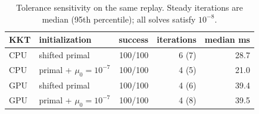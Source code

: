\begin{table}[t]
\centering
\caption{Tolerance sensitivity on the same replay. Steady iterations are median (95th percentile); all solves satisfy $10^{-8}$.}
\label{tab:warm-start-tolerance}
\small
\begin{tabular}{llrrr}
\toprule
KKT & initialization & success & iterations & median ms\\
\midrule
CPU & shifted primal & 100/100 & 6 (7) & 28.7\\
CPU & primal + $\mu_0=10^{-7}$ & 100/100 & 4 (5) & 21.0\\
GPU & shifted primal & 100/100 & 4 (6) & 39.4\\
GPU & primal + $\mu_0=10^{-7}$ & 100/100 & 4 (8) & 39.5\\
\bottomrule
\end{tabular}
\end{table}
